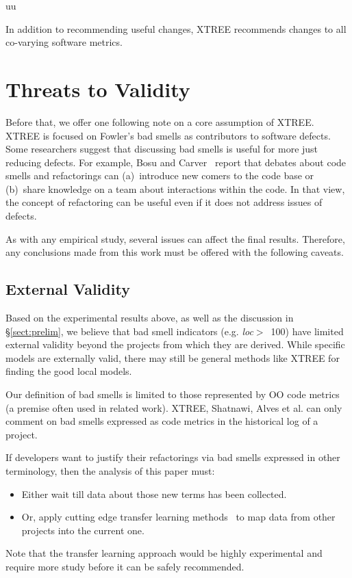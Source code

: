 uu \documentclass[final,twocolumn,5p]{elsarticle}
\newcommand{\tion}[1]{\S\ref{sect:#1}}
\theoremstyle{break}
\begin{document}
\begin{itemize}
\begin{lesson}
In addition to recommending useful changes, XTREE recommends changes to all co-varying software metrics.
\end{lesson}


\section{Threats to Validity}\label{sect:valid}



Before  that, we offer one following note on a
core assumption of XTREE.
XTREE   is focused on Fowler's bad smells
as contributors to software defects. Some researchers 
 suggest that discussing bad smells is useful for more just reducing defects. For example, Bosu and Carver~\cite{bosu13} report that
debates about code smells and refactorings can (a)~introduce new comers to the code base or (b)~share knowledge on a team
about interactions within the code. In that view, 
the concept of refactoring can be useful
even if it does not address issues of defects. 


As with any empirical study, several issues can affect the final results. Therefore, any
conclusions made from this work must be offered with the following
caveats.

\subsection{External Validity}
Based on the experimental results above,
as well as the discussion in \tion{prelim},
we believe that bad smell indicators (e.g. \mbox{{\em loc}$>$ 100})
have limited external validity beyond the projects from which they are derived. 
While specific models are externally valid,
there may still be general methods like XTREE for finding the good local models.  


Our definition of bad smells is limited to those represented by OO code metrics (a premise often used in related work).   
XTREE, Shatnawi, Alves et al. can  only comment
on bad smells   expressed as code metrics 
  in the historical log of a project. 


If developers want to justify their refactorings
via bad smells expressed in other terminology,
then the  analysis of this paper must:
\begin{itemize}
    \item Either wait till 
data about those new
terms has been collected. 
\item Or, apply cutting edge transfer learning
methods~\cite{Nam15,Jing15} to map data from other projects
into the current one.
\end{itemize}
Note that the transfer learning approach would
be highly experimental and require more study
before it can be safely recommended.


\end{itemize}
\end{document}
